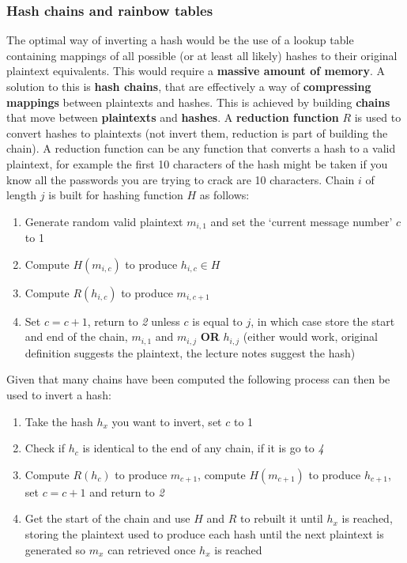 \documentclass[final]{article}
\begin{document}
\subsubsection{Hash chains and rainbow tables}
The optimal way of inverting a hash would be the use of a lookup table containing mappings of all possible (or at least all likely) hashes to their original plaintext equivalents. This would require a \textbf{massive amount of memory}. A solution to this is \textbf{hash chains}, that are effectively a way of \textbf{compressing mappings} between plaintexts and hashes. This is achieved by building \textbf{chains} that move between \textbf{plaintexts} and \textbf{hashes}. A \textbf{reduction function} $ R $ is used to convert hashes to plaintexts (not invert them, reduction is part of building the chain). A reduction function can be any function that converts a hash to a valid plaintext, for example the first 10 characters of the hash might be taken if you know all the passwords you are trying to crack are 10 characters.
Chain $ i $ of length $ j $ is built for hashing function $ H $ as follows:
\begin{enumerate}
	\item Generate random valid plaintext $ m_{i,1} $ and set the `current message number' $ c $ to 1
	\item Compute $ H(m_{i,c}) $ to produce $ h_{i,c} \in H $
	\item Compute $ R(h_{i,c}) $ to produce $ m_{i,c+1} $
	\item Set $ c = c + 1 $, return to \textit{2} unless $ c $ is equal to $ j $, in which case store the start and end of the chain, $ m_{i,1} $ and $ m_{i,j} $ \textbf{OR} $ h_{i,j} $ (either would work, original definition suggests the plaintext, the lecture notes suggest the hash)
\end{enumerate}
Given that many chains have been computed the following process can then be used to invert a hash:
\begin{enumerate}
	\item Take the hash $ h_{x} $ you want to invert, set $ c $ to 1
	\item Check if $ h_{c} $ is identical to the end of any chain, if it is go to \textit{4}
	\item Compute $ R(h_{c}) $ to produce $ m_{c+1} $, compute $ H(m_{c+1}) $ to produce $ h_{c+1} $, set $ c = c + 1 $ and return to \textit{2}
	\item Get the start of the chain and use $ H $ and $ R $ to rebuilt it until $ h_{x} $ is reached, storing the plaintext used to produce each hash until the next plaintext is generated so $ m_{x} $ can retrieved once $ h_{x} $ is reached
\end{enumerate}
\end{document}
